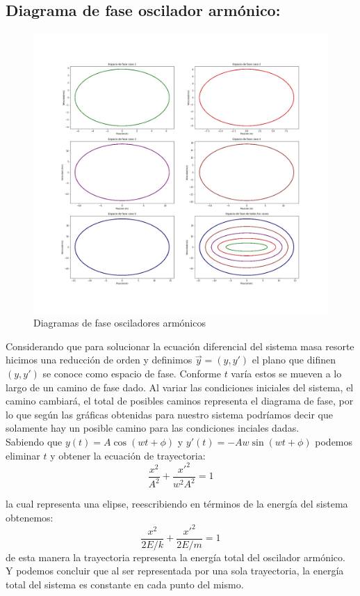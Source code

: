 \documentclass{article}
\begin{document}
\subsection{Diagrama de fase oscilador armónico:}
\begin{figure}[htp]
    \centering
    \includegraphics[width=17cm]{Diagfaseoscilador.jpg}
    \caption{Diagramas de fase osciladores armónicos}
    \label{fig:fase1}
\end{figure}

Considerando que para solucionar la ecuación diferencial del sistema masa resorte hicimos una reducción de orden y definimos $\vec{y}=(y,y')$ el plano que difinen $(y,y')$  se conoce como espacio de fase. Conforme $t$ varía estos se mueven a lo largo de un camino de fase dado. Al variar las condiciones iniciales del sistema, el camino cambiará, el total de posibles caminos representa el diagrama de fase, por lo que según las gráficas obtenidas para nuestro sistema podríamos decir que solamente hay un posible camino para las condiciones inciales dadas. \\

Sabiendo que $y(t)= A\cos(wt+\phi)$ y $y'(t)=-Aw\sin(wt+\phi)$ podemos eliminar $t$ y obtener la ecuación de trayectoria: \\ $$\frac{x^2}{A^2}+\frac{x'^2}{w^2A^2}=1$$ 

la cual representa una elipse, reescribiendo en términos de la energía del sistema obtenemos: \\ $$\frac{x^2}{2E/k}+\frac{x'^2}{2E/m}=1 $$ de esta manera la trayectoria representa la energía total del oscilador armónico. Y podemos concluir que al ser representada por una sola trayectoria, la energía total del sistema es constante en cada punto del mismo.
\end{document}
